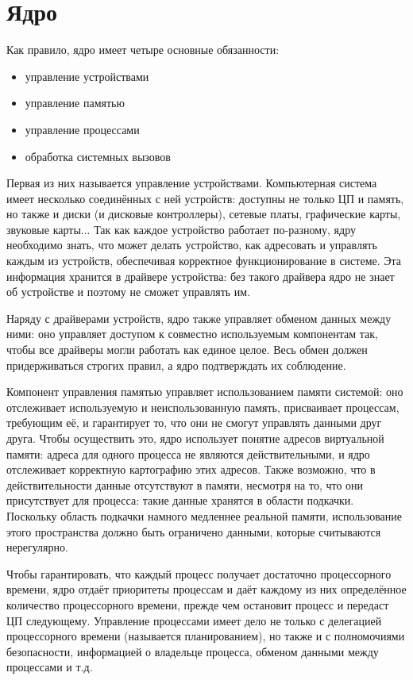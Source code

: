 \documentclass[10pt]{book}
\begin{document}
\section{Ядро}

Как правило, ядро имеет четыре основные обязанности:
\begin{itemize}
	\item управление устройствами
	\item управление памятью
	\item управление процессами
	\item обработка системных вызовов
\end{itemize}

Первая из них называется управление устройствами. Компьютерная система имеет несколько соединённых с ней устройств: доступны не только ЦП и память, но также и диски (и дисковые контроллеры), сетевые платы, графические карты, звуковые карты... Так как каждое устройство работает по-разному, ядру необходимо знать, что может делать устройство, как адресовать и управлять каждым из устройств, обеспечивая корректное функционирование в  системе. Эта информация хранится в драйвере устройства: без такого драйвера ядро не знает об устройстве и поэтому не сможет управлять им.

Наряду с драйверами устройств, ядро также управляет обменом данных между ними: оно управляет доступом к совместно используемым компонентам так, чтобы все драйверы могли работать как единое целое. Весь обмен должен придерживаться строгих правил, а ядро подтверждать их соблюдение.

Компонент управления памятью управляет использованием памяти системой: оно отслеживает используемую и неиспользованную память, присваивает процессам,  требующим её, и гарантирует то, что они не смогут управлять данными друг друга. Чтобы осуществить это, ядро использует понятие адресов виртуальной памяти: адреса для одного процесса не являются действительными, и ядро отслеживает корректную картографию этих адресов. Также возможно, что в действительности данные отсутствуют в памяти, несмотря на то, что они присутствует для процесса: такие данные хранятся в области подкачки. Поскольку область подкачки намного медленнее реальной памяти, использование этого пространства должно быть ограничено данными, которые считываются нерегулярно.

Чтобы гарантировать, что каждый процесс получает достаточно процессорного времени, ядро отдаёт приоритеты процессам и даёт каждому из них определённое количество процессорного времени, прежде чем остановит процесс и передаст ЦП следующему. Управление процессами имеет дело не только с делегацией процессорного времени (называется планированием), но также и с полномочиями безопасности, информацией о владельце процесса, обменом данными между процессами и т.д.
\end{document}
